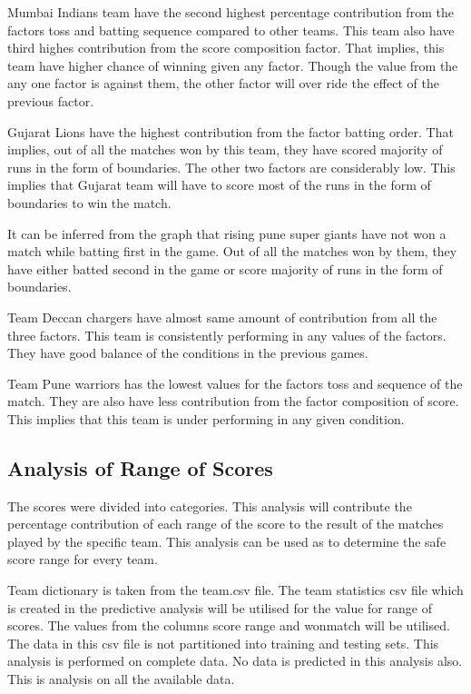 \documentclass[sigconf]{acmart}
\begin{document}
Mumbai Indians team have the second highest percentage contribution from the factors toss and batting sequence compared to other teams. This team also have third highes contribution from the score composition factor. That implies, this team have higher chance of winning given any factor. Though the value from the any one factor is against them, the other factor will over ride the effect of the previous factor.


Gujarat Lions have the highest contribution from the factor batting order. That implies, out of all the matches won by this team, they have scored majority of runs in the form of boundaries. The other two factors are considerably low. This implies that Gujarat team will have to score most of the runs in the form of boundaries to win the match.


It can be inferred from the graph that rising pune super giants have not won a match while batting first in the game. Out of all the matches won by them, they have either batted second in the game or score majority of runs in the form of boundaries.

Team Deccan chargers have almost same amount of contribution from all the three factors. This team is consistently performing in any values of the factors. They have good balance of the conditions in the previous games.

Team Pune warriors has the lowest values for the factors toss and sequence of the match. They are also have less contribution from the factor composition of score. This implies that this team is under performing in any given condition. 

\subsection{Analysis of Range of Scores}

The scores were divided into categories. This analysis will contribute the percentage contribution of each range of the score to the result of the matches played by the specific team. This analysis can be used as to determine the safe score range for every team. 


Team dictionary is taken from the team.csv file. The team statistics csv file which is created in the predictive analysis will be utilised for the value for range of scores. The values from the columns score range and wonmatch will be utilised. The data in this csv file is not partitioned into training and testing sets. This analysis is performed on complete data. No data is predicted in this analysis also. This is analysis on all the available data. 
\end{document}
